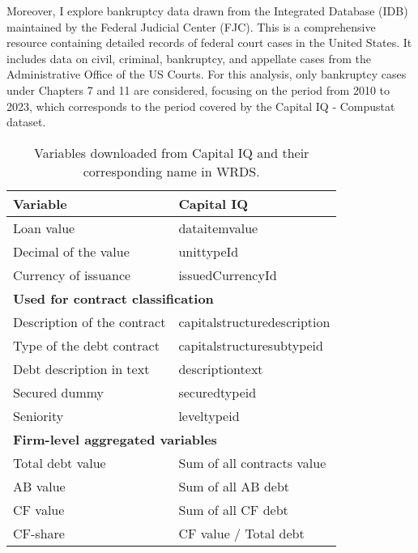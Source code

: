 \documentclass[12pt]{article}
\begin{document}
Moreover, I explore bankruptcy data drawn from the Integrated Database (IDB) maintained by the Federal Judicial Center (FJC). This is a comprehensive resource containing detailed records of federal court cases in the United States. It includes data on civil, criminal, bankruptcy, and appellate cases from the Administrative Office of the US Courts. For this analysis, only bankruptcy cases under Chapters 7 and 11 are considered, focusing on the period from 2010 to 2023, which corresponds to the period covered by the Capital IQ - Compustat dataset. 

\begin{table}[htbp]    

    \centering
    \begin{tabular}{ll}
    \toprule
    Variable & Capital IQ \\
    \midrule
    Loan value & dataitemvalue \\
    Decimal of the value & unittypeId \\
    Currency of issuance & issuedCurrencyId \vspace{3mm} \\
    \multicolumn{2}{l}{\textbf{Used for contract classification}} \\
    Description of the contract & capitalstructuredescription \\
    Type of the debt contract & capitalstructuresubtypeid \\
    Debt description in text & descriptiontext \\
    Secured dummy & securedtypeid \\
    Seniority & leveltypeid \vspace{3mm} \\
    \multicolumn{2}{l}{\textbf{Firm-level aggregated variables}} \\
    Total debt value & Sum of all contracts value \\
    AB value & Sum of all AB debt \\
    CF value & Sum of all CF debt \\
    CF-share & CF value / Total debt \\
    \bottomrule
    \end{tabular}
    \caption{\small Variables downloaded from Capital IQ and their corresponding name in WRDS.}
    \label{tab:CAPIQ}

\end{table}
\end{document}
